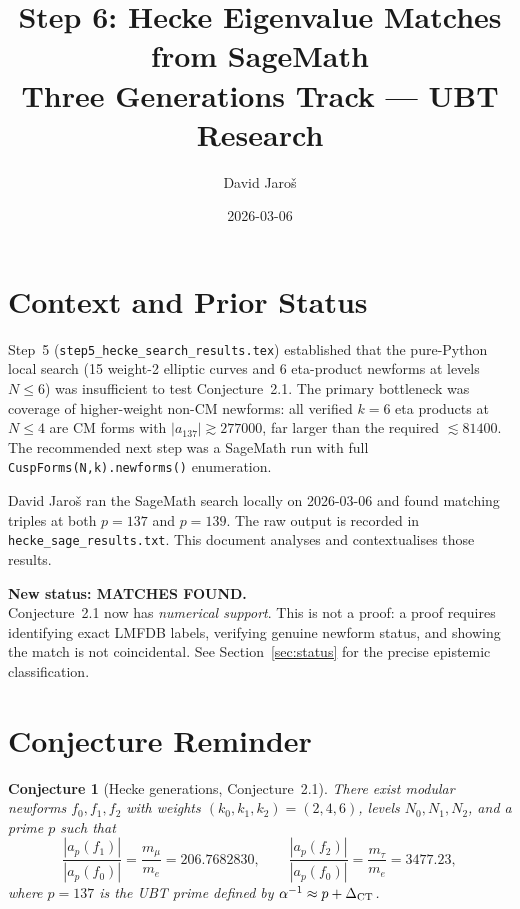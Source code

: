 \documentclass[12pt,a4paper]{article}
\title{%
  Step 6: Hecke Eigenvalue Matches from SageMath\\
  \large Three Generations Track --- UBT Research}
\author{David Jaroš}
\date{2026-03-06}
\newtheorem{conjecture}{Conjecture}
\begin{document}
\maketitle
\tableofcontents

\section{Context and Prior Status}

Step~5 (\texttt{step5\_hecke\_search\_results.tex}) established that the
pure-Python local search (15 weight-2 elliptic curves and 6 eta-product
newforms at levels $N \le 6$) was insufficient to test Conjecture~2.1.
The primary bottleneck was coverage of higher-weight non-CM newforms: all
verified $k=6$ eta products at $N \le 4$ are CM forms with
$|a_{137}| \gtrsim 277000$, far larger than the required $\lesssim 81400$.
The recommended next step was a SageMath run with full
\texttt{CuspForms(N,k).newforms()} enumeration.

David Jaroš ran the SageMath search locally on 2026-03-06 and found
matching triples at both $p = 137$ and $p = 139$.  The raw output is
recorded in \texttt{hecke\_sage\_results.txt}.  This document analyses
and contextualises those results.

\begin{center}
\colorbox{green!15}{\parbox{0.85\linewidth}{%
  \textbf{New status: MATCHES FOUND.}\\
  Conjecture~2.1 now has \emph{numerical support}.
  This is not a proof: a proof requires identifying exact LMFDB labels,
  verifying genuine newform status, and showing the match is not
  coincidental.  See Section~\ref{sec:status} for the precise epistemic
  classification.
}}
\end{center}

\section{Conjecture Reminder}

\begin{conjecture}[Hecke generations, Conjecture~2.1]
\label{conj:hecke}
There exist modular newforms $f_0, f_1, f_2$ with weights $(k_0, k_1, k_2)
= (2, 4, 6)$, levels $N_0, N_1, N_2$, and a prime $p$ such that
\begin{equation}
  \label{eq:conjecture21}
  \frac{|a_p(f_1)|}{|a_p(f_0)|} = \frac{m_\mu}{m_e} = 206.7682830,
  \qquad
  \frac{|a_p(f_2)|}{|a_p(f_0)|} = \frac{m_\tau}{m_e} = 3477.23,
\end{equation}
where $p = 137$ is the UBT prime defined by $\alpha^{-1} \approx p +
\Delta_{\rm CT}$.
\end{conjecture}
\end{document}
